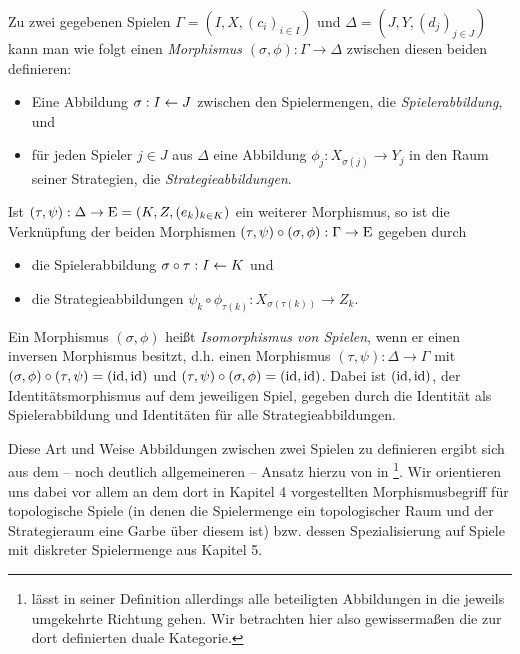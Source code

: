 \begin{defn}\label{defn:MorphismusVonSpielen}
	Zu zwei gegebenen Spielen $\Gamma = (I, X, (c_i)_{i\in I})$ und $\Delta = (J, Y, (d_j)_{j\in J})$ kann man wie folgt einen \emph{Morphismus} $(\sigma, \phi): \Gamma \to \Delta$ zwischen diesen beiden definieren:
	\begin{itemize}
		\item Eine Abbildung $\sigma: I \leftarrow J$ zwischen den Spielermengen, die \emph{Spielerabbildung}, und
		\item für jeden Spieler $j \in J$ aus $\Delta$ eine Abbildung $\phi_j: X_{\sigma(j)} \to Y_j$ in den Raum seiner Strategien, die \emph{Strategieabbildungen}.
	\end{itemize}
	Ist $(\tau, \psi): \Delta \to \mathrm{E} = (K, Z, (e_k)_{k \in K})$ ein weiterer Morphismus, so ist die Verknüpfung der beiden Morphismen $(\tau, \psi) \circ (\sigma, \phi): \Gamma \to \mathrm{E}$ gegeben durch
	\begin{itemize}
		\item die Spielerabbildung $\sigma\circ\tau: I \leftarrow K$ und
		\item die Strategieabbildungen $\psi_k \circ \phi_{\tau(k)}: X_{\sigma(\tau(k))} \to Z_k$.
	\end{itemize}
	Ein Morphismus $(\sigma, \phi)$ heißt \emph{Isomorphismus von Spielen}, wenn er einen inversen Morphismus besitzt, d.h. einen Morphismus $(\tau, \psi): \Delta \to \Gamma$ mit $(\sigma, \phi) \circ (\tau, \psi) = (\mathrm{id}, \mathrm{id})$ und $(\tau, \psi) \circ (\sigma, \phi) = (\mathrm{id}, \mathrm{id})$. Dabei ist $(\mathrm{id}, \mathrm{id})$, der Identitätsmorphismus auf dem jeweiligen Spiel, gegeben durch die Identität als Spielerabbildung und Identitäten für alle Strategieabbildungen.
\end{defn}

Diese Art und Weise Abbildungen zwischen zwei Spielen zu definieren ergibt sich aus dem -- noch deutlich allgemeineren -- Ansatz hierzu von \citeauthor{LapGameCat} in \cite{LapGameCat}\footnote{\citeauthor{LapGameCat} lässt in seiner Definition allerdings alle beteiligten Abbildungen in die jeweils umgekehrte Richtung gehen. Wir betrachten hier also gewissermaßen die zur dort definierten duale Kategorie.}. Wir orientieren uns dabei vor allem an dem dort in Kapitel 4 vorgestellten Morphismusbegriff für topologische Spiele (in denen die Spielermenge ein topologischer Raum und der Strategieraum eine Garbe über diesem ist) bzw. dessen Spezialisierung auf Spiele mit diskreter Spielermenge aus Kapitel 5. 

